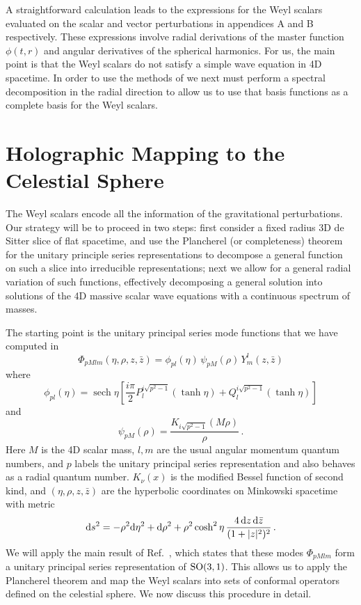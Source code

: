 \documentclass{brownthesis}
\DeclareMathOperator{\sech}{sech}
\def\dd{{\rm d}}
\begin{document}
A straightforward calculation leads to the expressions for the Weyl
scalars evaluated on the scalar and vector perturbations in appendices
A and B respectively. These expressions involve radial derivations
of the master function $\phi(t,r)$ and angular derivatives of the
spherical harmonics. For us, the main point is that the Weyl scalars
do not satisfy a simple wave equation in 4D spacetime. In order to
use the methods of \cite{Liu:2021tif} we next must perform a spectral
decomposition in the radial direction to allow us to use that basis
functions as a complete basis for the Weyl scalars.

\section{Holographic Mapping to the Celestial Sphere}

The Weyl scalars encode all the information of the gravitational perturbations.
Our strategy will be to proceed in two steps: first consider a fixed
radius 3D de Sitter slice of flat spacetime, and use the Plancherel
(or completeness) theorem for the unitary principle series representations
to decompose a general function on such a slice into irreducible representations;
next we allow for a general radial variation of such functions, effectively
decomposing a general solution into solutions of the 4D massive scalar
wave equations with a continuous spectrum of masses.

The starting point is the unitary principal series mode functions
that we have computed in \cite{Liu:2021tif}
\[
\Phi_{pMlm}(\eta,\rho,z,\bar{z})=\phi_{pl}(\eta)\,\psi_{pM}(\rho)\,Y_{m}^{l}(z,\bar{z})
\]
where
\[
\phi_{pl}(\eta)=\sech\eta\left[\frac{i\pi}{2}P_{l}^{i\sqrt{p^{2}-1}}\left(\tanh\eta\right)+Q_{l}^{i\sqrt{p^{2}-1}}\left(\tanh\eta\right)\right]
\]
and
\[
\psi_{pM}(\rho)=\frac{K_{i\sqrt{p^{2}-1}}(M\rho)}{\rho}\,.
\]
Here $M$ is the 4D scalar mass, $l,m$ are the usual angular momentum
quantum numbers, and $p$ labels the unitary principal series representation
and also behaves as a radial quantum number. $K_{\nu}(x)$ is the
modified Bessel function of second kind, and $(\eta,\rho,z,\bar{z})$
are the hyperbolic coordinates on Minkowski spacetime with metric
\[
\dd s^{2}=-\rho^{2}\dd\eta^{2}+\dd\rho^{2}+\rho^{2}\cosh^{2}\eta\,\frac{4\,\dd z\,\dd\bar{z}}{(1+|z|^{2})^{2}}\,.
\]
We will apply the main result of Ref.~\cite{Liu:2021tif}, which
states that these modes $\Phi_{pMlm}$ form a unitary principal series
representation of ${\rm SO(3,1)}$. This allows us to apply the Plancherel
theorem \cite{knapp2001representation} and map the Weyl scalars into
sets of conformal operators defined on the celestial sphere. We now
discuss this procedure in detail.
\end{document}
